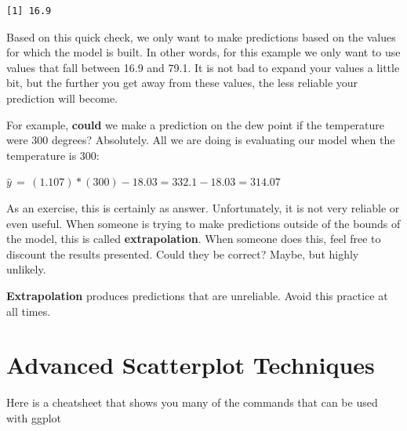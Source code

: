 \documentclass[
  letterpaper,
  DIV=11,
  numbers=noendperiod]{scrreprt}
\begin{document}
\begin{verbatim}
[1] 16.9
\end{verbatim}

Based on this quick check, we only want to make predictions based on the
values for which the model is built. In other words, for this example we
only want to use values that fall between 16.9 and 79.1. It is not bad
to expand your values a little bit, but the further you get away from
these values, the less reliable your prediction will become.

For example, \textbf{could} we make a prediction on the dew point if the
temperature were 300 degrees? Absolutely. All we are doing is evaluating
our model when the temperature is 300:

\(\hat{y} \, = \, (1.107)*(300) - 18.03 = 332.1 - 18.03 = 314.07\)

As an exercise, this is certainly as answer. Unfortunately, it is not
very reliable or even useful. When someone is trying to make predictions
outside of the bounds of the model, this is called
\textbf{extrapolation}. When someone does this, feel free to discount
the results presented. Could they be correct? Maybe, but highly
unlikely.

\begin{tcolorbox}[enhanced jigsaw, breakable, arc=.35mm, leftrule=.75mm, toprule=.15mm, titlerule=0mm, coltitle=black, colframe=quarto-callout-important-color-frame, left=2mm, opacitybacktitle=0.6, rightrule=.15mm, bottomrule=.15mm, colback=white, toptitle=1mm, opacityback=0, title=\textcolor{quarto-callout-important-color}{\faExclamation}\hspace{0.5em}{Important}, bottomtitle=1mm, colbacktitle=quarto-callout-important-color!10!white]

\textbf{Extrapolation} produces predictions that are unreliable. Avoid
this practice at all times.

\end{tcolorbox}


\chapter*{Advanced Scatterplot
Techniques}\label{advanced-scatterplot-techniques}


\begin{tcolorbox}[enhanced jigsaw, breakable, arc=.35mm, leftrule=.75mm, toprule=.15mm, titlerule=0mm, coltitle=black, colframe=quarto-callout-tip-color-frame, left=2mm, opacitybacktitle=0.6, rightrule=.15mm, bottomrule=.15mm, colback=white, toptitle=1mm, opacityback=0, title=\textcolor{quarto-callout-tip-color}{\faLightbulb}\hspace{0.5em}{ggplot cheatsheet}, bottomtitle=1mm, colbacktitle=quarto-callout-tip-color!10!white]

Here is a cheatsheet that shows you many of the commands that can be
used with ggplot

\end{tcolorbox}
\end{document}
